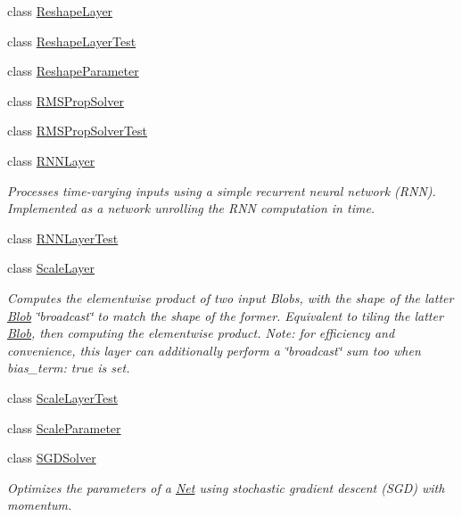 \begin{DoxyCompactItemize}
\item 
class \mbox{\hyperlink{classcaffe_1_1_reshape_layer}{Reshape\+Layer}}
\item 
class \mbox{\hyperlink{classcaffe_1_1_reshape_layer_test}{Reshape\+Layer\+Test}}
\item 
class \mbox{\hyperlink{classcaffe_1_1_reshape_parameter}{Reshape\+Parameter}}
\item 
class \mbox{\hyperlink{classcaffe_1_1_r_m_s_prop_solver}{R\+M\+S\+Prop\+Solver}}
\item 
class \mbox{\hyperlink{classcaffe_1_1_r_m_s_prop_solver_test}{R\+M\+S\+Prop\+Solver\+Test}}
\item 
class \mbox{\hyperlink{classcaffe_1_1_r_n_n_layer}{R\+N\+N\+Layer}}
\begin{DoxyCompactList}\small\item\em Processes time-\/varying inputs using a simple recurrent neural network (R\+NN). Implemented as a network unrolling the R\+NN computation in time. \end{DoxyCompactList}\item 
class \mbox{\hyperlink{classcaffe_1_1_r_n_n_layer_test}{R\+N\+N\+Layer\+Test}}
\item 
class \mbox{\hyperlink{classcaffe_1_1_scale_layer}{Scale\+Layer}}
\begin{DoxyCompactList}\small\item\em Computes the elementwise product of two input Blobs, with the shape of the latter \mbox{\hyperlink{classcaffe_1_1_blob}{Blob}} \char`\"{}broadcast\char`\"{} to match the shape of the former. Equivalent to tiling the latter \mbox{\hyperlink{classcaffe_1_1_blob}{Blob}}, then computing the elementwise product. Note\+: for efficiency and convenience, this layer can additionally perform a \char`\"{}broadcast\char`\"{} sum too when {\ttfamily bias\+\_\+term\+: true} is set. \end{DoxyCompactList}\item 
class \mbox{\hyperlink{classcaffe_1_1_scale_layer_test}{Scale\+Layer\+Test}}
\item 
class \mbox{\hyperlink{classcaffe_1_1_scale_parameter}{Scale\+Parameter}}
\item 
class \mbox{\hyperlink{classcaffe_1_1_s_g_d_solver}{S\+G\+D\+Solver}}
\begin{DoxyCompactList}\small\item\em Optimizes the parameters of a \mbox{\hyperlink{classcaffe_1_1_net}{Net}} using stochastic gradient descent (S\+GD) with momentum. \end{DoxyCompactList}\item 

\end{DoxyCompactItemize}
